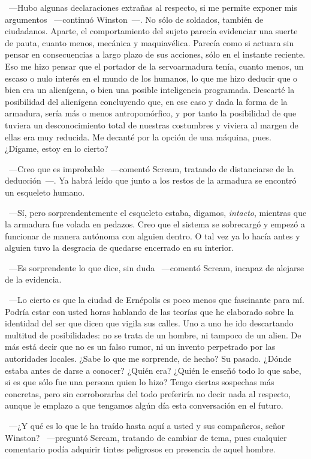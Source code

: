 ~---Hubo algunas declaraciones extrañas al respecto, si me permite exponer mis argumentos ~---continuó Winston~---. No sólo de soldados, también de ciudadanos. Aparte, el comportamiento del sujeto parecía evidenciar una suerte de pauta, cuanto menos, mecánica y maquiavélica. Parecía como si actuara sin pensar en consecuencias a largo plazo de sus acciones, sólo en el instante reciente. Eso me hizo pensar que el portador de la servoarmadura tenía, cuanto menos, un escaso o nulo interés en el mundo de los humanos, lo que me hizo deducir que o bien era un alienígena, o bien una posible inteligencia programada. Descarté la posibilidad del alienígena concluyendo que, en ese caso y dada la forma de la armadura, sería más o menos antropomórfico, y por tanto la posibilidad de que tuviera un desconocimiento total de nuestras costumbres y viviera al margen de ellas era muy reducida. Me decanté por la opción de una máquina, pues. ¿Dígame, estoy en lo cierto?

~---Creo que es improbable ~---comentó Scream, tratando de distanciarse de la deducción~---. Ya habrá leído que junto a los restos de la armadura se encontró un esqueleto humano.

~---Sí, pero sorprendentemente el esqueleto estaba, digamos, \emph{intacto}, mientras que la armadura fue volada en pedazos. Creo que el sistema se sobrecargó y empezó a funcionar de manera autónoma con alguien dentro. O tal vez ya lo hacía antes y alguien tuvo la desgracia de quedarse encerrado en su interior.

~---Es sorprendente lo que dice, sin duda ~---comentó Scream, incapaz de alejarse de la evidencia.

~---Lo cierto es que la ciudad de Ernépolis es poco menos que fascinante para mí. Podría estar con usted horas hablando de las teorías que he elaborado sobre la identidad del ser que dicen que vigila sus calles. Uno a uno he ido descartando multitud de posibilidades: no se trata de un hombre, ni tampoco de un alien. De más está decir que no es un falso rumor, ni un invento perpetrado por las autoridades locales. ¿Sabe lo que me sorprende, de hecho? Su pasado. ¿Dónde estaba antes de darse a conocer? ¿Quién era? ¿Quién le enseñó todo lo que sabe, si es que sólo fue una persona quien lo hizo? Tengo ciertas sospechas más concretas, pero sin corroborarlas del todo preferiría no decir nada al respecto, aunque le emplazo a que tengamos algún día esta conversación en el futuro.

~---¿Y qué es lo que le ha traído hasta aquí a usted y sus compañeros, señor Winston? ~---preguntó Scream, tratando de cambiar de tema, pues cualquier comentario podía adquirir tintes peligrosos en presencia de aquel hombre.


